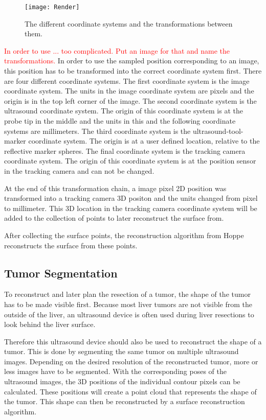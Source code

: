 \begin{figure}[H]
  \centering
  \texttt{[image: Render]}
  \caption{The different coordinate systems and the transformations between them.}
  \label{fig:Render}
\end{figure}

\textcolor{red}{In order to use ... too complicated. Put an image for that and name the transformations.}
In order to use the sampled position corresponding to an image, this
position has to be transformed into the correct coordinate system first. There
are four different coordinate systems. The first coordinate system is the image
coordinate system. The units in the image coordinate system are pixels and the
origin is in the top left corner of the image. The
second coordinate system is the ultrasound coordinate system. The origin of this
coordinate system is at the probe tip in the middle and the units in this and
the following coordinate systems are millimeters. The third coordinate system is the
ultrasound-tool-marker coordinate system. The origin is at a user defined
location, relative to the reflective marker spheres. The final
coordinate system is the tracking camera coordinate system. The origin of this
coordinate system is at the position sensor in the tracking camera and can not
be changed.

At the end of this transformation chain, a image pixel 2D position was
transformed into a tracking camera 3D positon and the units changed
from pixel to millimeter. This 3D location in the tracking camera coordinate system
will be added to the collection of points to later reconstruct the surface from.

After collecting the surface points, the reconstruction algorithm from Hoppe
\cite{hoppe1992surface} reconstructs the surface from these points.
\subsection{Tumor Segmentation}
To reconstruct and later plan the resection of a tumor, the shape
of the tumor has to be made visible first. Because most liver tumors are not visible from the outside of the liver, an
ultrasound device is often used during liver resections to look behind the
liver surface.

Therefore this ultrasound device should also be used to
reconstruct the shape of a tumor. This is done by segmenting the same tumor on
multiple ultrasound images. Depending on the desired resolution of the
reconstructed tumor, more or less images have to be segmented. With the corresponding
poses of the ultrasound images, the 3D positions of the individual contour
pixels can be calculated. These positions will create a point cloud that
represents the shape of the tumor. This shape can then be reconstructed by a
surface reconstruction algorithm.
